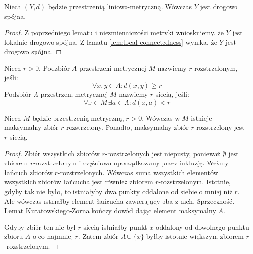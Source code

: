 \begin{lem} \label{lem:connectedness}
  Niech $(Y, d)$ będzie przestrzenią liniowo-metryczną. Wówczas $Y$ jest drogowo spójna.
  \begin{proof}
    Z poprzedniego lematu i niezmienniczości metryki wnioskujemy, że $Y$ jest lokalnie drogowo spójna. Z lematu \ref{lem:local-connectedness} wynika, że $Y$ jest drogowo spójna.
  \end{proof}
\end{lem}



\begin{df}
  Niech $r > 0$. Podzbiór $A$ przestrzeni metrycznej $M$ nazwiemy $r$-rozstrzelonym, jeśli:
  \[
    \forall x, y \in A: d(x,y) \geq r
  \]
  Podzbiór $A$ przestrzeni metrycznej $M$ nazwiemy $r$-siecią, jeśli:
  \[
    \forall x \in M\ \exists a \in A: d(x,a) < r
  \]
\end{df}

\begin{lem} \label{lem:anti-net}
  Niech $M$ będzie przestrzenią metryczną, $r > 0$. Wówczas w $M$ istnieje maksymalny zbiór $r$-rozstrzelony. Ponadto, maksymalny zbiór $r$-rozstrzelony jest $r$-siecią.
  \begin{proof}
    Zbiór wszystkich zbiorów $r$-rozstrzelonych jest niepusty, ponieważ $\emptyset$ jest zbiorem $r$-rozstrzelonym i częściowo uporządkowany przez inkluzję. Weźmy łańcuch zbiorów $r$-rozstrzelonych. Wówczas suma wszystkich elementów wszystkich zbiorów łańcucha jest również zbiorem $r$-rozstrzelonym. Istotnie, gdyby tak nie było, to istniałyby dwa punkty oddalone od siebie o mniej niż $r$. Ale wówczas istniałby element łańcucha zawierający oba z nich. Sprzeczność. Lemat Kuratowskiego-Zorna kończy dowód dając element maksymalny $A$.
    
    Gdyby zbiór ten nie był $r$-siecią istniałby punkt $x$ oddalony od dowolnego punktu zbioru $A$ o co najmniej $r$. Zatem zbiór $A \cup \{x\}$ byłby istotnie większym zbiorem $r$-rozstrzelonym.
  \end{proof}
\end{lem}

